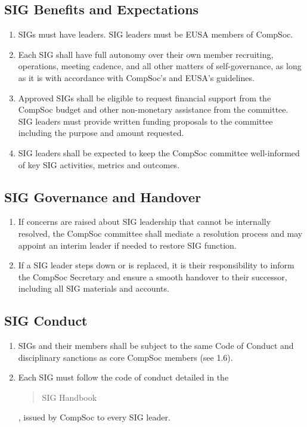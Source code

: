 \subsection{SIG Benefits and Expectations}  
\begin{enumerate}
    \item SIGs must have leaders. SIG leaders must be EUSA members of CompSoc.
    \item Each SIG shall have full autonomy over their own member recruiting, operations, meeting cadence, and all other matters of self-governance, as long as it is with accordance with CompSoc's and EUSA's guidelines.  
    \item Approved SIGs shall be eligible to request financial support from the CompSoc budget and other non-monetary assistance from the committee. SIG leaders must provide written funding proposals to the committee including the purpose and amount requested.
    \item SIG leaders shall be expected to keep the CompSoc committee well-informed of key SIG activities, metrics and outcomes.
\end{enumerate}

\subsection{SIG Governance and Handover}
\begin{enumerate}
    \item If concerns are raised about SIG leadership that cannot be internally resolved, the CompSoc committee shall mediate a resolution process and may appoint an interim leader if needed to restore SIG function.
    \item If a SIG leader steps down or is replaced, it is their responsibility to inform the CompSoc Secretary and ensure a smooth handover to their successor, including all SIG materials and accounts.
\end{enumerate}

\subsection{SIG Conduct}
\begin{enumerate}
    \item SIGs and their members shall be subject to the same Code of Conduct and disciplinary sanctions as core CompSoc members (see 1.6).
    \item Each SIG must follow the code of conduct detailed in the \blockquote{SIG Handbook}, issued by CompSoc to every SIG leader.
\end{enumerate}

